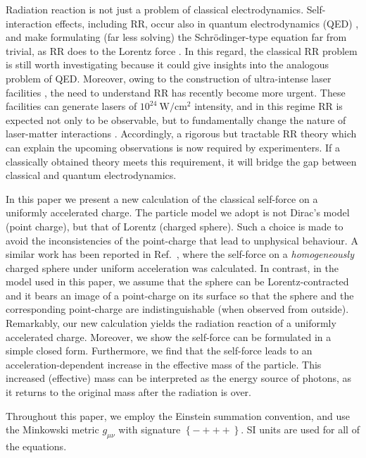 \documentclass[a4paper,fleqn]{cas-sc}
\begin{document}
Radiation reaction is not just a problem of classical electrodynamics. Self-interaction effects, including RR, occur also in quantum electrodynamics (QED) \cite{Higuchi2006,Ilderton2013}, and make formulating (far less solving) the Schr\"{o}dinger-type equation far from trivial, as RR does to the Lorentz force \cite{Bild2019}. In this regard, the classical RR problem is still worth investigating because it could give insights into the analogous problem of QED. Moreover, owing to the construction of ultra-intense laser facilities \cite{Mourou2019}, the need to understand RR has recently become more urgent. These facilities can generate lasers of $10^{24}~\mathrm{W}/\mathrm{cm}^{2}$ intensity, and in this regime RR is expected not only to be observable, but to fundamentally change the nature of laser-matter interactions \cite{Blackburn2020}. Accordingly, a rigorous but tractable RR theory which can explain the upcoming observations is now required by experimenters. If a classically obtained theory meets this requirement, it will bridge the gap between classical and quantum electrodynamics.

In this paper we present a new calculation of the classical self-force on a uniformly accelerated charge. The particle model we adopt is not Dirac's model (point charge), but that of Lorentz (charged sphere). Such a choice is made to avoid the inconsistencies of the point-charge that lead to unphysical behaviour. A similar work has been reported in Ref.~\cite{Steane2015}, where the self-force on a \textit{homogeneously} charged sphere under uniform acceleration was calculated. In contrast, in the model used in this paper, we assume that the sphere can be Lorentz-contracted and it bears an image of a point-charge on its surface so that the sphere and the corresponding point-charge are indistinguishable (when observed from outside). Remarkably, our new calculation yields the radiation reaction of a uniformly accelerated charge. Moreover, we show the self-force can be formulated in a simple closed form. Furthermore, we find that the self-force leads to an acceleration-dependent increase in the effective mass of the particle. This increased (effective) mass can be interpreted as the energy source of photons, as it returns to the original mass after the radiation is over.

Throughout this paper, we employ the Einstein summation convention, and use the Minkowski metric $g_{\mu\nu}$ with signature $\left\{-+++\right\}$. SI units are used for all of the equations.
 
\end{document}
